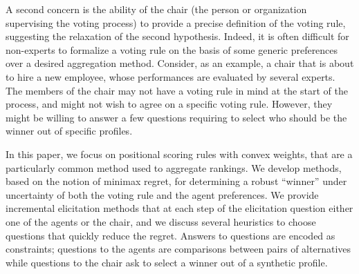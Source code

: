\documentclass[runningheads]{llncs}
\begin{document}
A second concern is the ability of the chair (the person or organization supervising the voting process) to provide a precise definition of the voting rule, suggesting the relaxation of the second hypothesis. Indeed, it is often difficult for non-experts to formalize a voting rule on the basis of some generic preferences over a desired aggregation method. 
Consider, as an example, a chair that is about to hire a new employee, whose performances are evaluated by several experts. The members of the chair may not have a voting rule in mind at the start of the process, and might not wish to agree on a specific voting rule. However, they might be willing to answer a few questions requiring to select who should be the winner out of specific profiles. 

In this paper, we focus on positional scoring rules with convex weights, that are a particularly common method used to aggregate rankings. 
We develop methods, based on the notion of minimax regret, for determining a robust ``winner'' under uncertainty of both the voting rule and the agent preferences.
We provide incremental elicitation methods that 
at each step of the elicitation question either one of the agents or the chair, and we discuss several heuristics to choose questions that quickly reduce the regret. 
Answers to questions are encoded as constraints; questions to the agents are comparisons between pairs of alternatives while
questions to the chair ask to select a winner out of a synthetic profile.
\end{document}
